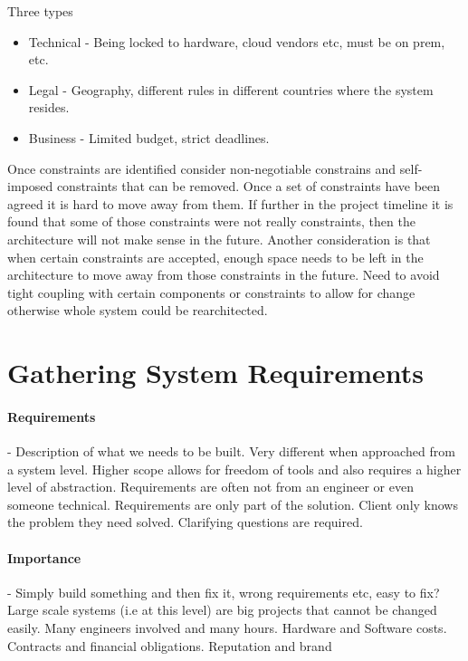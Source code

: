 \documentclass[a4paper, 11pt]{book}
\begin{document}
    Three types

    \begin{itemize}
        \item Technical - Being locked to hardware, cloud vendors etc, must be on prem, etc.
        \item Legal - Geography, different rules in different countries where the system resides.
        \item Business - Limited budget, strict deadlines.
    \end{itemize}

    Once constraints are identified consider non-negotiable constrains and self-imposed constraints that can be removed.
    Once a set of constraints have been agreed it is hard to move away from them.
    If further in the project timeline it is found that some of those constraints were not really constraints, then the architecture will not make sense in the future.
    Another consideration is that when certain constraints are accepted, enough space needs to be left in the architecture to move away from those constraints in the future.
    Need to avoid tight coupling with certain components or constraints to allow for change otherwise whole system could be rearchitected.


    \section{Gathering System Requirements}

    \paragraph{Requirements} - Description of what we needs to be built.
    Very different when approached from a system level.
    Higher scope allows for freedom of tools and also requires a higher level of abstraction.
    Requirements are often not from an engineer or even someone technical.
    Requirements are only part of the solution.
    Client only knows the problem they need solved.
    Clarifying questions are required.

    \paragraph{Importance} - Simply build something and then fix it, wrong requirements etc, easy to fix?
    Large scale systems (i.e at this level) are big projects that cannot be changed easily.
    Many engineers involved and many hours.
    Hardware and Software costs.
    Contracts and financial obligations.
    Reputation and brand
\end{document}
